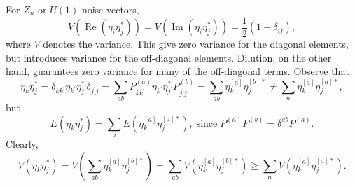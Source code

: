 For $Z_n$ or $U(1)$ noise vectors,
\begin{equation}
    V\left(\operatorname{Re}\left(\eta_{i} \eta_{j}^{*}\right)\right)=V\left(\operatorname{Im}\left(\eta_{i} \eta_{j}^{*}\right)\right)=\frac{1}{2}\left(1-\delta_{i j}\right),
\end{equation}
where $V$ denotes the variance. This give zero variance for the diagonal elements, but introduces variance for the off-diagonal elements. Dilution, on the other hand, guarantees zero variance for many of the off-diagonal terms. Observe that
\begin{equation}
    \eta_{k} \eta_{j}^{*}=\delta_{k k^{\prime}} \eta_{k^{\prime}} \eta_{j^{\prime}}^{*} \delta_{j^{\prime} j}=\sum_{a b} P_{k k^{\prime}}^{(a)} \eta_{k^{\prime}} \eta_{j^{\prime}}^{*} P_{j^{\prime} j}^{(b)}=\sum_{a b} \eta_{k}^{[a]} \eta_{j}^{[b] *} \neq  \sum_{a} \eta_{k}^{[a]} \eta_{j}^{[a] *},
\end{equation}
but
\begin{equation}
    E\left(\eta_{k} \eta_{j}^{*}\right)=\sum_{a} E\left(\eta_{k}^{[a]} \eta_{j}^{[a] *}\right),\; \text{since}\; P^{(a)} P^{(b)}=\delta^{a b} P^{(a)}.
\end{equation}
Clearly,
\begin{equation}
    V\left(\eta_k \eta_j^*\right) = V\left(\sum_{ab}\eta_k^{[a]} \eta_j^{[b]*}\right) = \sum_{ab}V\left(\eta_k^{[a]} \eta_j^{[b]*}\right) \geq \sum_{a}V\left(\eta_k^{[a]} \eta_j^{[a]*}\right).
\end{equation}
